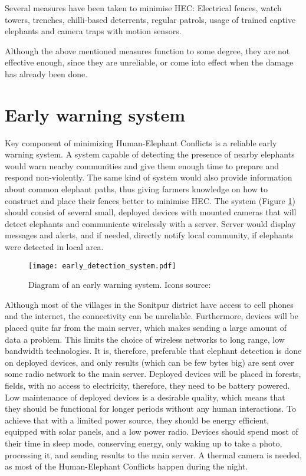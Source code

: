 Several measures have been taken to minimise HEC: Electrical fences, watch towers, trenches, chilli-based deterrents, regular patrols, usage of trained captive elephants and camera traps with motion sensors.

Although the above mentioned measures function to some degree, they are not effective enough, since they are unreliable, or come into effect when the damage has already been done\cite{wildlabs}. 

\section{ Early warning system}\label{early_detection_system}

Key component of minimizing Human-Elephant Conflicts is a reliable early warning system. 
A system capable of detecting the presence of nearby elephants would warn nearby communities and give them enough time to prepare and respond non-violently.
The same kind of system would also provide information about common elephant paths, thus giving farmers knowledge on how to construct and place their fences better to minimise HEC.
The system (Figure \ref{early_detection_system_diagram}) should consist of several small, deployed devices with mounted cameras that will detect elephants and communicate wirelessly with a server.
Server would display messages and alerts, and if needed, directly notify local community, if elephants were detected in local area.
\newline
\begin{figure}[ht]
        \centering
        \texttt{[image: early\_detection\_system.pdf]} 
        \caption[Diagram of an early warning system.]{Diagram of an early warning system. Icons source:\cite{icons}}
        \label{early_detection_system_diagram}
\end{figure}

Although most of the villages in the Sonitpur district have access to cell phones and the internet, the connectivity can be unreliable\cite{wildlabs-elephants}. 
Furthermore, devices will be placed quite far from the main server, which makes sending a large amount of data a problem. 
This limits the choice of wireless networks to long range, low bandwidth technologies.
It is, therefore, preferable that elephant detection is done on deployed devices, and only results (which can be few bytes big) are sent over some radio network to the main server.
Deployed devices will be placed in forests, fields, with no access to electricity, therefore, they need to be battery powered.
Low maintenance of deployed devices is a desirable quality, which means that they should be functional for longer periods without any human interactions.
To achieve that with a limited power source, they should be energy efficient, equipped with solar panels, and a low power radio.
Devices should spend most of their time in sleep mode, conserving energy, only waking up to take a photo, processing it, and sending results to the main server.
A thermal camera is needed, as most of the Human-Elephant Conflicts happen during the night\cite{wildlabs-elephants}.


